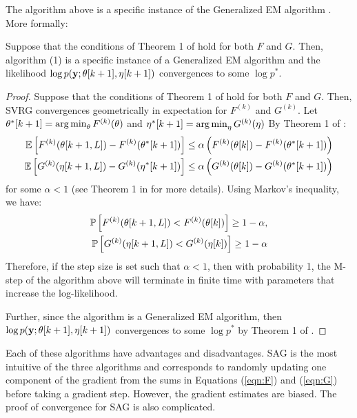 The algorithm above is a specific instance of the Generalized EM algorithm \citep{Dempster:1977}. More formally:

\begin{lemma}
    Suppose that the conditions of Theorem 1 of \citet{Johnson:2013} hold for both $F$ and $G$. Then, algorithm (1) is a specific instance of a Generalized EM algorithm and the likelihood $\log p(\mathbf{y} ; \theta[k+1],\eta[k+1])$ convergences to some $\log p^*$.
\end{lemma}
%
\begin{proof}
Suppose that the conditions of Theorem 1 of \citet{Johnson:2013} hold for both $F$ and $G$. Then, SVRG convergences geometrically in expectation for $F^{(k)}$ and $G^{(k)}$. Let $\theta^*[k+1] = \operatorname*{arg\,min}_\theta F^{(k)}(\theta)$ and $\eta^*[k+1] = \operatorname*{arg\,min}_\eta G^{(k)}(\eta)$ By Theorem 1 of \citet{Johnson:2013}: 
%
\begin{align*}
    \mathbb{E}\left[F^{(k)}(\theta[k+1,L]) - F^{(k)}(\theta^*[k+1])\right] \leq \alpha \left(F^{(k)}(\theta[k]) - F^{(k)}(\theta^*[k+1])\right) \\
    \mathbb{E}\left[G^{(k)}(\eta[k+1,L]) - G^{(k)}(\eta^*[k+1])\right] \leq \alpha \left(G^{(k)}(\theta[k]) - G^{(k)}(\theta^*[k+1])\right)
\end{align*}
%
for some $\alpha < 1$ (see Theorem 1 in \citet{Johnson:2013} for more details). Using Markov's inequality, we have:
\begin{align*}
    \mathbb{P}\left[F^{(k)}(\theta[k+1,L]) < F^{(k)}(\theta[k])\right] \geq 1-\alpha, \\
    \mathbb{P}\left[G^{(k)}(\eta[k+1,L]) < G^{(k)}(\eta[k])\right] \geq 1-\alpha
\end{align*}
Therefore, if the step size is set such that $\alpha < 1$, then with probability 1, the M-step of the algorithm above will terminate in finite time with parameters that increase the log-likelihood.

Further, since the algorithm is a Generalized EM algorithm, then $\log p(\mathbf{y} ; \theta[k+1],\eta[k+1])$ convergences to some $\log p^*$ by Theorem 1 of \citep{Wu:1983}.
\end{proof}

Each of these algorithms have advantages and disadvantages. SAG is the most intuitive of the three algorithms and corresponds to randomly updating one component of the gradient from the sums in Equations (\ref{eqn:F}) and (\ref{eqn:G}) before taking a gradient step. However, the gradient estimates are biased. The proof of convergence for SAG is also complicated.


